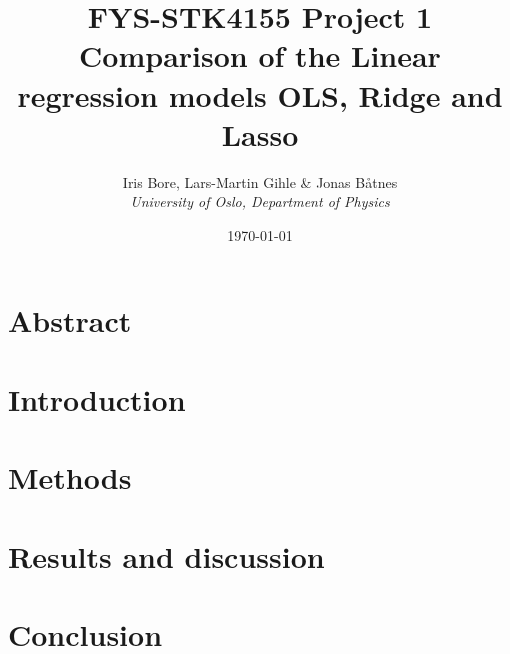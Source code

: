 \documentclass[12pt,a4paper,english,nofootinbib,sort&compress,numbers]{revtex4-2} %
\begin{document}
\title{FYS-STK4155 Project 1 \\ Comparison of the Linear regression models OLS, Ridge and Lasso}       
\author{Iris Bore, Lars-Martin Gihle \& Jonas Båtnes   \\ \textit{University of Oslo, Department of Physics}}   %
\date{\today}                  %


\noaffiliation                 %

\begin{abstract}
    
\end{abstract}

\maketitle

\section{Abstract}
%
\label{sec:Abstract}


\newpage
\section{Introduction}
%
\label{sec:introduction}


\newpage
\section{Methods}\label{sec:methods}
%
\label{sec:methods}


\newpage
\section{Results and discussion}\label{sec:results_and_discussion}
%
\label{sec:results}


\newpage
\section{Conclusion}\label{sec:conclusion}
%
\label{sec:conclusion}

\end{document}
